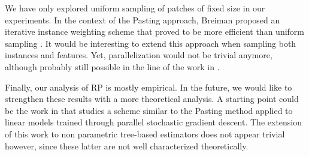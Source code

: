 We have only explored uniform sampling of patches of fixed size in our
experiments. In the context of the Pasting approach, Breiman proposed
an iterative instance weighting scheme that proved to be more
efficient than uniform sampling \citep{breiman:1999}. It would be
interesting to extend this approach when sampling both instances and
features. Yet, parallelization would not be trivial anymore, although
probably still possible in the line of the work in \citep{chawla:2004}.

Finally, our analysis of RP is
mostly empirical. In the future, we would like to strengthen these
results with a more theoretical analysis. A starting point could be
the work in \citep{zinkevich:2010} that studies a scheme similar to the
Pasting method applied to linear models trained through parallel
stochastic gradient descent. The extension of this work to non
parametric tree-based estimators does not appear trivial however,
since these latter are not well characterized
theoretically.
